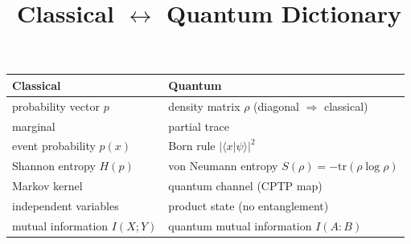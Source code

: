 \documentclass[11pt]{article}
\title{Classical $\leftrightarrow$ Quantum Dictionary}
\date{}
\begin{document}
\maketitle
\begin{longtable}{p{} p{}}
\toprule
\textbf{Classical} & \textbf{Quantum} \\
\midrule
\endhead
probability vector $p$ & density matrix $\rho$ (diagonal $\Rightarrow$ classical) \\
marginal & partial trace \\
event probability $p(x)$ & Born rule $|\langle x|\psi\rangle|^2$ \\
Shannon entropy $H(p)$ & von Neumann entropy $S(\rho) = -\mathrm{tr}(\rho\log\rho)$ \\
Markov kernel & quantum channel (CPTP map) \\
independent variables & product state (no entanglement) \\
mutual information $I(X;Y)$ & quantum mutual information $I(A{:}B)$ \\
\bottomrule
\end{longtable}
\end{document}
